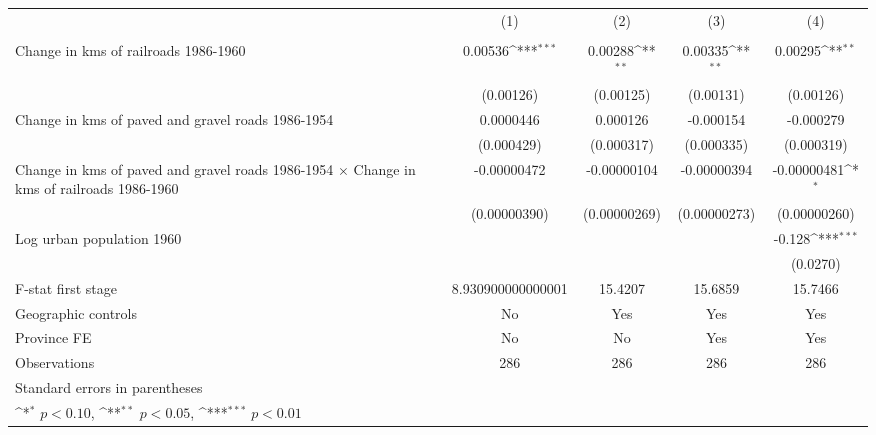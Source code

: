 {
\def\sym#1{\ifmmode^{#1}\else\(^{#1}\)\fi}
\begin{tabular}{l*{4}{c}}
\hline\hline
                &\multicolumn{1}{c}{(1)}&\multicolumn{1}{c}{(2)}&\multicolumn{1}{c}{(3)}&\multicolumn{1}{c}{(4)}\\
                &\multicolumn{1}{c}{}&\multicolumn{1}{c}{}&\multicolumn{1}{c}{}&\multicolumn{1}{c}{}\\
\hline
Change in kms of railroads 1986-1960&  0.00536\sym{***}&  0.00288\sym{**} &  0.00335\sym{**} &  0.00295\sym{**} \\
                &(0.00126)         &(0.00125)         &(0.00131)         &(0.00126)         \\
[1em]
Change in kms of paved and gravel roads 1986-1954&0.0000446         & 0.000126         &-0.000154         &-0.000279         \\
                &(0.000429)         &(0.000317)         &(0.000335)         &(0.000319)         \\
[1em]
Change in kms of paved and gravel roads 1986-1954 $\times$ Change in kms of railroads 1986-1960&-0.00000472         &-0.00000104         &-0.00000394         &-0.00000481\sym{*}  \\
                &(0.00000390)         &(0.00000269)         &(0.00000273)         &(0.00000260)         \\
[1em]
Log urban population 1960&                  &                  &                  &   -0.128\sym{***}\\
                &                  &                  &                  & (0.0270)         \\
\hline
F-stat first stage&8.930900000000001         &  15.4207         &  15.6859         &  15.7466         \\
Geographic controls&       No         &      Yes         &      Yes         &      Yes         \\
Province FE     &       No         &       No         &      Yes         &      Yes         \\
Observations    &      286         &      286         &      286         &      286         \\
\hline\hline
\multicolumn{5}{l}{\footnotesize Standard errors in parentheses}\\
\multicolumn{5}{l}{\footnotesize \sym{*} \(p<0.10\), \sym{**} \(p<0.05\), \sym{***} \(p<0.01\)}\\
\end{tabular}
}
